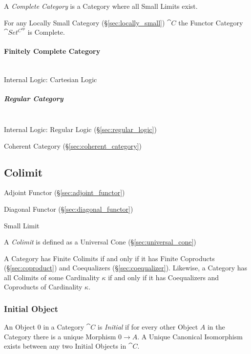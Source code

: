 A \emph{Complete Category} is a Category where all Small Limits exist.

For any Locally Small Category (\S\ref{sec:locally_small})
$\cat{C}$ the Functor Category $\cat{Set^{C^{op}}}$ is Complete.



\paragraph{Finitely Complete Category}
\label{sec:finitely_complete_category}
\hfill \\

Internal Logic: Cartesian Logic %



\subparagraph{Regular Category}\label{sec:regular_category}
\hfill \\

Internal Logic: Regular Logic (\S\ref{sec:regular_logic})

Coherent Category (\S\ref{sec:coherent_category})



\subsection{Colimit} \label{sec:colimit}

Adjoint Functor (\S\ref{sec:adjoint_functor})

Diagonal Functor (\S\ref{sec:diagonal_functor})

Small Limit

A \emph{Colimit} is defined as a Universal Cone
(\S\ref{sec:universal_cone})

A Category has Finite Colimits if and only if it has Finite Coproducts
(\S\ref{sec:coproduct}) and Coequalizers (\S\ref{sec:coequalizer}).
Likewise, a Category has all Colimits of some Cardinality $\kappa$ if
and only if it has Coequalizers and Coproducts of Cardinality
$\kappa$.



\subsubsection{Initial Object}\label{sec:initial_object}

An Object $0$ in a Category $\cat{C}$ is \emph{Initial} if for
every other Object $A$ in the Category there is a unique Morphism $0
\rightarrow A$. A Unique Canonical Isomorphism exists between any two
Initial Objects in $\cat{C}$.

